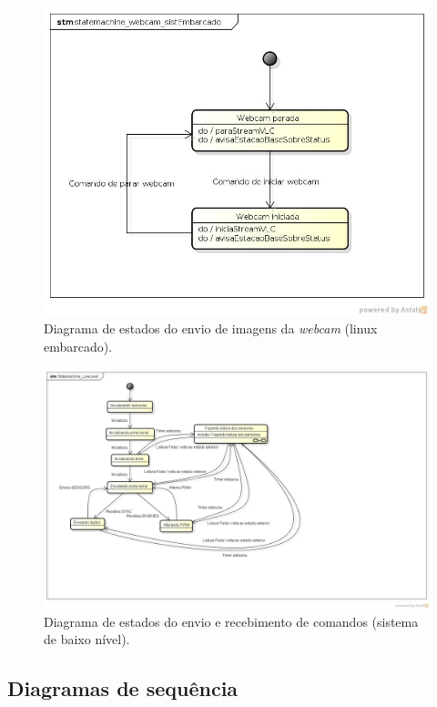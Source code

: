 \begin{figure}[H]
  \centering
  \includegraphics[width=\textwidth, keepaspectratio]{./figuras/sistEmbarcado/statemachine_webcam_sistEmbarcado.jpg}
  \caption{Diagrama de estados do envio de imagens da \textit{webcam} (linux embarcado).}
  \label{fig:diagrama_estados_webcam_sist_embarcado}
\end{figure}

\begin{figure}[H]
  \centering
  \includegraphics[width=\textwidth, keepaspectratio]{./figuras/statemachine_LowLevel.jpg}
  \caption{Diagrama de estados do envio e recebimento de comandos (sistema de baixo nível).}
  \label{fig:diagrama_estados_baixo_nivel}
\end{figure}


\subsection{Diagramas de sequência}

